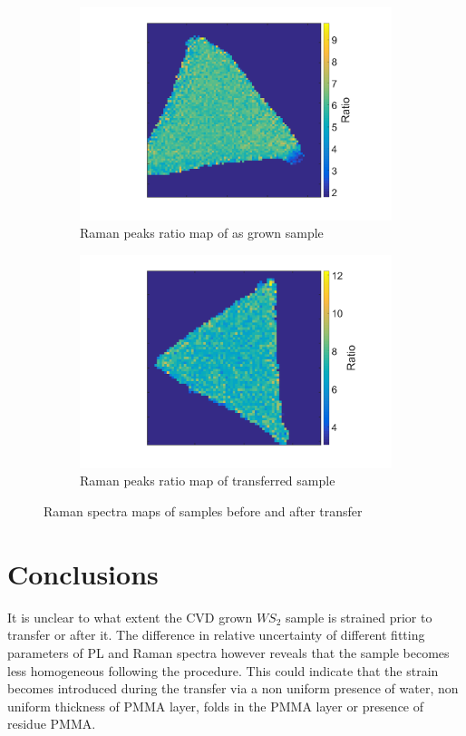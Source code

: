 \begin{figure}[ht]
\begin{center}
\begin{subfigure}[b]{0.4\textwidth}
			\includegraphics[scale=0.15]{Transfer/TransferRamanRatioMapAsgrown.png}
			\caption{Raman peaks ratio map of as grown sample}
			\label{fig:TransferRamanRatioAMapAsgrown}
		\end{subfigure}
		\quad
		\begin{subfigure}[b]{0.4\textwidth}
			\includegraphics[scale=0.15]{Transfer/TransferRamanRatioMapTransferred.png}
			\caption{Raman peaks ratio map of transferred sample}
			\label{fig:TransferRamanRatioAMapTransferred}
		\end{subfigure}
		\caption{Raman spectra maps of samples before and after transfer}
		\label{fig:TransferRamanDiffRatioMapsComparison}
	\end{center}
\end{figure}
	
\section{Conclusions}
	
	It is unclear to what extent the CVD grown $WS_2$ sample is strained prior to transfer or after it. The difference in relative uncertainty of different fitting parameters of PL and Raman spectra however reveals that the sample becomes less homogeneous following the procedure. This could indicate that the strain becomes introduced during the transfer via a non uniform presence of water, non uniform thickness of PMMA layer, folds in the PMMA layer or presence of residue PMMA. 